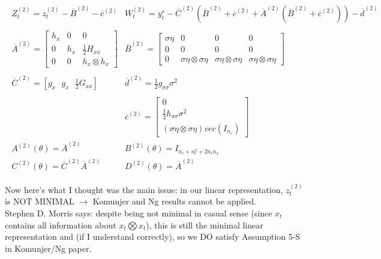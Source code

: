 \documentclass[10pt]{article}
\numberwithin{equation}{section}
\theoremstyle{definition}
\theoremstyle{remark}
\begin{document}
\begin{eqnarray*}\displaystyle
	\begin{array}{ll}
		Z_{t}^{(2)} = z_t^{(2)}-\overline{B}^{(2)}-\overline{c}^{(2)} & W_t^{(2)} = y^s_t - \overline{C}^{(2)}(\overline{B}^{(2)}+\overline{c}^{(2)} + \overline{A}^{(2)}(\overline{B}^{(2)}+\overline{c}^{(2)}))	- \overline{d}^{(2)}\\
		\\
\overline{A}^{(2)} = \left[ \begin{array}{ccc}
h_x & 0 & 0 \\
0 & h_x & \frac{1}{2}H_{xx} \\
0 & 0 & h_x \otimes h_x \end{array} \right] & \overline{B}^{(2)} = \left[ \begin{array}{cccc}
\sigma \eta & 0 & 0 & 0 \\
0 & 0 & 0 & 0 \\
0 & \sigma \eta \otimes \sigma \eta & \sigma \eta \otimes \sigma \eta & \sigma \eta \otimes \sigma \eta \end{array} \right]\\
\\
\overline{C}^{(2)} = [g_x \text{ }g_x \text{ }\frac{1}{2}G_{xx}] & \overline{d}^{(2)} = \frac{1}{2}g_{\sigma \sigma}\sigma^2\\
\\

& \overline{c}^{(2)} = \left[ \begin{array}{c} 0\\ \frac{1}{2}h_{\sigma \sigma}\sigma^2 \\ (\sigma \eta \otimes \sigma \eta )vec(I_{n_\epsilon}) \end{array} \right]\\
A^{(2)}(\theta ) = \overline{A}^{(2)} & B^{(2)}(\theta ) = I_{n_\epsilon + n_\epsilon^2 + 2n_\epsilon n_x}\\
C^{(2)}(\theta ) = \overline{C}^{(2)}\overline{A}^{(2)} & D^{(2)}(\theta )= \overline{A}^{(2)}
\end{array}
\end{eqnarray*}

Now here's what I thought was the main issue: in our linear representation, $z_t^{(2)}$ is NOT MINIMAL $\rightarrow$ Komunjer and Ng results cannot be applied.\\

Stephen D. Morris says: despite being not minimal in casual sense (since $x_t$ contains all information about $x_t \bigotimes x_t$), this is still the minimal linear representation and (if I understand correctly), so we DO satisfy Assumption 5-S in Komunjer/Ng paper.\\
\end{document}

